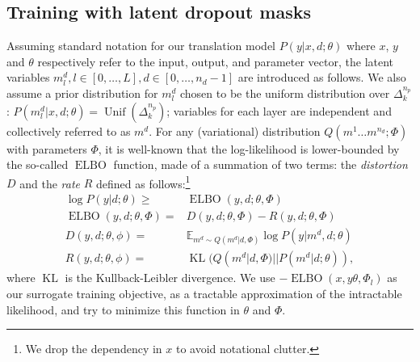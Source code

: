\documentclass[11pt]{article}
\begin{document}
\subsection{Training with latent dropout masks}
Assuming standard notation for our translation model  $P(y|x,d;\theta)$ where $x$, $y$ and $\theta$ respectively refer to the input, output, and parameter vector, the latent variables $m_{l}^d, l \in[0,\dots,L], d \in [0, \dots, n_d-1]$ are introduced as follows. We also assume a prior distribution for $m_{l}^d$ chosen to be the uniform distribution over $\Delta^{n_p}_k$: $P(m_l^d | x, d; \theta) = \operatorname{Unif}(\Delta^{n_p}_k)$; variables for each layer are independent and collectively referred to as $m^d$. For any (variational) distribution $Q(m^1 \dots m^{n_d}; \Phi)$ with parameters $\Phi$, it is well-known that the log-likelihood is lower-bounded by the so-called $\operatorname{ELBO}$ function, made of a summation of two terms: the \emph{distortion} $D$ and the \emph{rate} $R$ defined as follows:\footnote{We drop the dependency in $x$ to avoid notational clutter.}
\begin{align}
  \log P(y|d;\theta) \ge & \operatorname{ELBO}(y,d; \theta, \Phi) \nonumber \\
  \operatorname{ELBO}(y,d; \theta, \Phi) =&  D(y,d; \theta, \Phi) - R(y,d; \theta, \Phi) \label{eq:lower-bound}\\
  D(y,d; \theta, \phi) = & \mathbb{E}_{m^d \sim Q(m^d |d,\Phi)} \log P(y | m^d, d; \theta) \nonumber\\
  R(y,d; \theta, \phi) = & \operatorname{KL}(Q(m^d | d, \Phi)||P(m^d | d; \theta)), \nonumber
\end{align}
where $\operatorname{KL}$ is the Kullback-Leibler divergence. We use $-\operatorname{ELBO}(x, y\theta,\Phi_l)$ as our surrogate training objective, as a tractable approximation of the intractable likelihood, and try to minimize this function in $\theta$ and $\Phi$.
\end{document}
